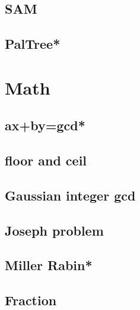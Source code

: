 \subsection{SAM}

\subsection{PalTree*} %



\section{Math}
\subsection{ax+by=gcd*} %

\subsection{floor and ceil}

\subsection{Gaussian integer gcd}

\subsection{Joseph problem}

% 
\subsection{Miller Rabin*} %

% 
\subsection{Fraction}

